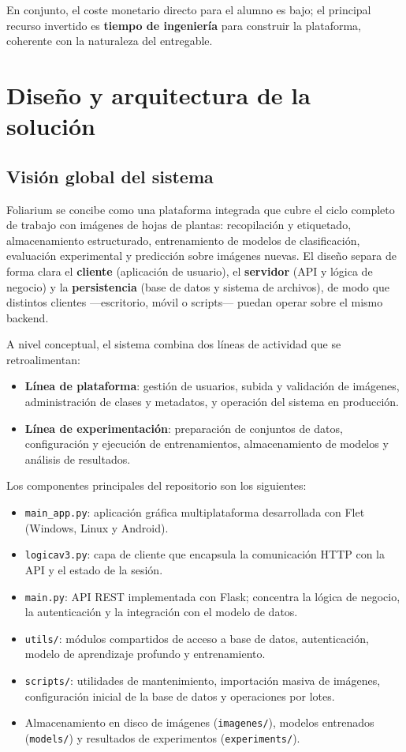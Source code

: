 \documentclass[11pt,spanish,listoffigures,listoftables]{tfgetsinf}
\begin{document}
En conjunto, el coste monetario directo para el alumno es bajo; el principal recurso invertido es \textbf{tiempo de ingeniería} para construir la plataforma, coherente con la naturaleza del entregable.

\chapter{Diseño y arquitectura de la solución}

\section{Visión global del sistema}

Foliarium se concibe como una plataforma integrada que cubre el ciclo completo de trabajo con imágenes de hojas de plantas: recopilación y etiquetado, almacenamiento estructurado, entrenamiento de modelos de clasificación, evaluación experimental y predicción sobre imágenes nuevas. El diseño separa de forma clara el \textbf{cliente} (aplicación de usuario), el \textbf{servidor} (API y lógica de negocio) y la \textbf{persistencia} (base de datos y sistema de archivos), de modo que distintos clientes ---escritorio, móvil o scripts--- puedan operar sobre el mismo backend.

A nivel conceptual, el sistema combina dos líneas de actividad que se retroalimentan:

\begin{itemize}
    \item \textbf{Línea de plataforma}: gestión de usuarios, subida y validación de imágenes, administración de clases y metadatos, y operación del sistema en producción.
    \item \textbf{Línea de experimentación}: preparación de conjuntos de datos, configuración y ejecución de entrenamientos, almacenamiento de modelos y análisis de resultados.
\end{itemize}

Los componentes principales del repositorio son los siguientes:

\begin{itemize}
    \item \texttt{main\_app.py}: aplicación gráfica multiplataforma desarrollada con Flet (Windows, Linux y Android).
    \item \texttt{logicav3.py}: capa de cliente que encapsula la comunicación HTTP con la API y el estado de la sesión.
    \item \texttt{main.py}: API REST implementada con Flask; concentra la lógica de negocio, la autenticación y la integración con el modelo de datos.
    \item \texttt{utils/}: módulos compartidos de acceso a base de datos, autenticación, modelo de aprendizaje profundo y entrenamiento.
    \item \texttt{scripts/}: utilidades de mantenimiento, importación masiva de imágenes, configuración inicial de la base de datos y operaciones por lotes.
    \item Almacenamiento en disco de imágenes (\texttt{imagenes/}), modelos entrenados (\texttt{models/}) y resultados de experimentos (\texttt{experiments/}).
\end{itemize}
\end{document}
